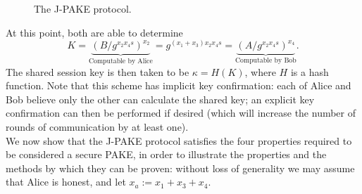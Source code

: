 \begin{figure}[h]
    \caption{The J-PAKE protocol.}
    \label{fig:JPAKE}
\end{figure}



 At this point, both are able to determine 
 \[ K = \underbrace{\left(B / g^{x_2x_4 s} \right)^{x_2}}_\text{Computable by Alice} = g^{(x_1+x_3)x_2x_4s} = 
 \underbrace{\left(A / g^{x_2x_4 s} \right)^{x_4}}_\text{Computable by Bob}. \]
 The shared session key is then taken to be $\kappa = H(K)$, where $H$ is a hash function. 
   Note that this scheme has implicit key confirmation: each of Alice and 
 Bob believe only the other can calculate the shared key; an explicit key confirmation can then be 
 performed if desired (which will increase the number of rounds of communication by at least one).
 \\ 
 We now show that the J-PAKE protocol satisfies the four properties required to be considered a secure PAKE,
in order to illustrate the properties and the methods by which they can be proven:
without loss of generality we may assume that Alice is honest, and let $x_a := x_1+x_3+x_4$.  


